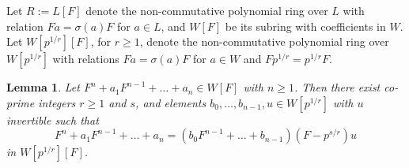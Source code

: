 \documentclass[]{amsart}
\theoremstyle{plain}
\newtheorem{lemma}[thm]{Lemma}
\theoremstyle{definition}
\theoremstyle{remark}
\newcommand{\<}{\langle}   %
\renewcommand{\>}{\rangle} %
\begin{document}
Let $R:=L[F]$ denote the non-commutative polynomial ring over $L$ with relation $F a=\sigma(a) F$ for $a\in L$, and $W[F]$ be its subring with coefficients in $W$. Let $W[p^{1/r}][F]$, for $r\ge 1$, denote the non-commutative polynomial ring over $W[p^{1/r}]$ with relations $F a=\sigma(a) F$ for $a\in W$ and $F p^{1/r}=p^{1/r} F$.

\begin{lemma} \label{lm:4.2}
   Let $F^n+a_1 F^{n-1}+\dots +a_n\in W[F]$ with $n\ge 1$. Then there exist co-prime integers $r\ge 1$ and $s$, and elements $b_0,\dots ,b_{n-1}, u\in W[p^{1/r}]$ with $u$ invertible such that 
   \begin{equation}\label{eq:4.2}
       F^n+a_1 F^{n-1}+\dots +a_n=(b_0 F^{n-1}+\dots +b_{n-1})(F-p^{s/r}) u 
   \end{equation}
   in $W[p^{1/r}][F]$.
\end{lemma}
\end{document}
